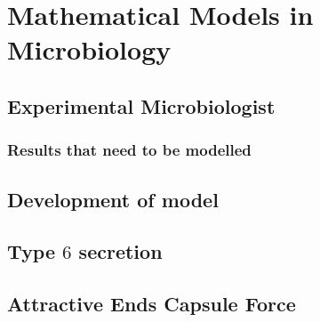 \chapter{Mathematical Models in Microbiology}
\section{Experimental Microbiologist}
\subsection{Results that need to be modelled}
\section{Development of model}
\section{Type \texorpdfstring{$6 $}{Lg} secretion}
\section{Attractive Ends Capsule Force}
